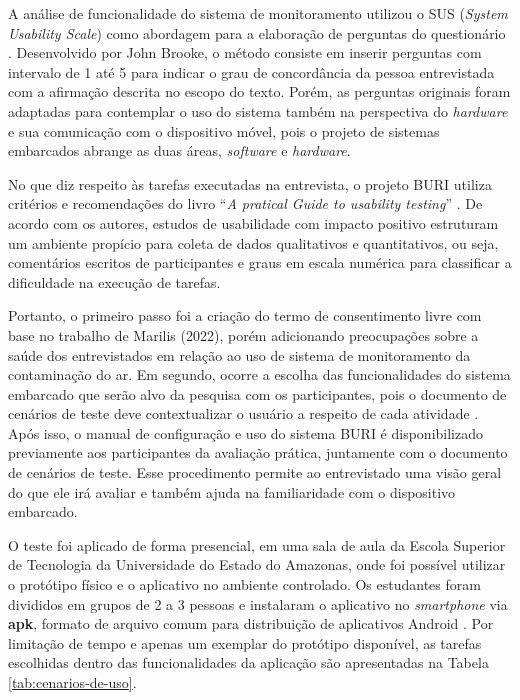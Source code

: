 A análise de funcionalidade do sistema de monitoramento utilizou o SUS (\textit{System Usability Scale}) como abordagem para a elaboração de perguntas do questionário \cite{sus-design-questionario}. Desenvolvido por John Brooke, o método 
consiste em inserir perguntas com intervalo de 1 até 5 para indicar o grau de concordância da pessoa entrevistada com a afirmação descrita no escopo do texto. Porém, as perguntas originais foram adaptadas para contemplar o uso do sistema 
também na perspectiva do \textit{hardware} e sua comunicação com o dispositivo móvel, pois o projeto de sistemas embarcados abrange as duas áreas, \textit{software} e \textit{hardware}.

No que diz respeito às tarefas executadas na entrevista, o projeto BURI utiliza critérios e 
recomendações do livro ``\textit{A pratical Guide to usability testing}'' \cite{tarefas-design}. De acordo com os autores, estudos 
de usabilidade com impacto positivo estruturam um ambiente propício para coleta de dados qualitativos e quantitativos, ou seja, comentários escritos de participantes e 
graus em escala numérica para classificar a dificuldade na execução de tarefas. 

Portanto, o primeiro passo foi a criação do termo de consentimento livre com base no trabalho de Marilis (2022), porém adicionando preocupações sobre a saúde dos entrevistados 
em relação ao uso de sistema de monitoramento da contaminação do ar. Em segundo, ocorre a escolha das funcionalidades do sistema embarcado que serão alvo da pesquisa com os participantes, pois 
o documento de cenários de teste deve contextualizar o usuário a respeito de cada atividade \cite{tarefas-design}. Após isso, o manual de configuração e uso do sistema BURI é disponibilizado 
previamente aos participantes da avaliação prática, juntamente com o documento de cenários de teste. Esse procedimento permite ao entrevistado uma visão geral do que ele irá avaliar e também 
ajuda na familiaridade com o dispositivo embarcado.

O teste foi aplicado de forma presencial, em uma sala de aula da Escola Superior de Tecnologia da Universidade do Estado do Amazonas, onde foi possível utilizar o protótipo físico
e o aplicativo no ambiente controlado. Os estudantes foram divididos em grupos de 2 a 3 pessoas e instalaram o 
aplicativo no \textit{smartphone} via \textbf{apk}, formato de arquivo comum para distribuição de aplicativos Android \cite{android-developers}. Por limitação de tempo e apenas um exemplar do protótipo disponível, as 
tarefas escolhidas dentro das funcionalidades da aplicação são apresentadas na Tabela \ref{tab:cenarios-de-uso}. 


